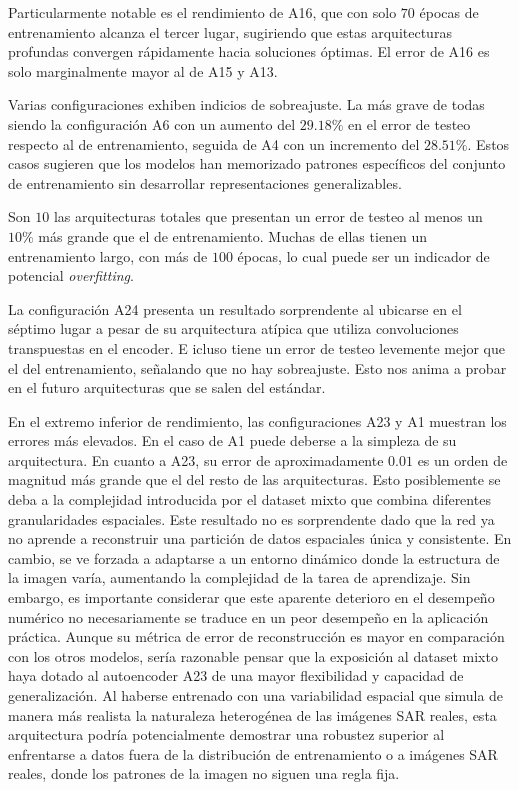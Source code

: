 Particularmente notable es el rendimiento de A16, que con solo $70$ épocas de entrenamiento alcanza el tercer lugar, sugiriendo que estas arquitecturas profundas convergen rápidamente hacia soluciones óptimas. El error de A16 es solo marginalmente mayor al de A15 y A13.


Varias configuraciones exhiben indicios de sobreajuste. La más grave de todas siendo la configuración A6 con un aumento del $29.18\%$ en el error de testeo respecto al de entrenamiento, seguida de A4 con un incremento del $28.51\%$. Estos casos sugieren que los modelos han memorizado patrones específicos del conjunto de entrenamiento sin desarrollar representaciones generalizables.

Son $10$ las arquitecturas totales que presentan un error de testeo al menos un $10\%$ más grande que el de entrenamiento. Muchas de ellas tienen un entrenamiento largo, con más de $100$ épocas, lo cual puede ser un indicador de potencial \emph{overfitting}.


La configuración A24 presenta un resultado sorprendente al ubicarse en el séptimo lugar a pesar de su arquitectura atípica que utiliza convoluciones transpuestas en el encoder. E icluso tiene un error de testeo levemente mejor que el del entrenamiento, señalando que no hay sobreajuste. Esto nos anima a probar en el futuro arquitecturas que se salen del estándar.

En el extremo inferior de rendimiento, las configuraciones A23 y A1 muestran los errores más elevados. En el caso de A1 puede deberse a la simpleza de su arquitectura. En cuanto a A23, su error de aproximadamente $0.01$ es un orden de magnitud más grande que el del resto de las arquitecturas. Esto posiblemente se deba a la complejidad introducida por el dataset mixto que combina diferentes granularidades espaciales. Este resultado no es sorprendente dado que la red ya no aprende a reconstruir una partición de datos espaciales única y consistente. En cambio, se ve forzada a adaptarse a un entorno dinámico donde la estructura de la imagen varía, aumentando la complejidad de la tarea de aprendizaje. Sin embargo, es importante considerar que este aparente deterioro en el desempeño numérico no necesariamente se traduce en un peor desempeño en la aplicación práctica. Aunque su métrica de error de reconstrucción es mayor en comparación con los otros modelos, sería razonable pensar que la exposición al dataset mixto haya dotado al autoencoder A23 de una mayor flexibilidad y capacidad de generalización. Al haberse entrenado con una variabilidad espacial que simula de manera más realista la naturaleza heterogénea de las imágenes SAR reales, esta arquitectura podría potencialmente demostrar una robustez superior al enfrentarse a datos fuera de la distribución de entrenamiento o a imágenes SAR reales, donde los patrones de la imagen no siguen una regla fija.


